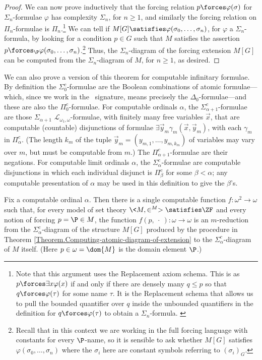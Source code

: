 \documentclass{amsart}
\newcommand{\xvec}{\vec{x}}
\newcommand{\yvec}{\vec{y}}
\begin{document}
\begin{proof}
We can now prove inductively that the forcing relation $p\forces\varphi(\sigma)$ for $\Sigma_n$-formulae $\varphi$ has complexity $\Sigma_n$, for $n\geq 1$, and similarly the forcing relation on $\Pi_n$-formulae is $\Pi_n$.\footnote{Note that this argument uses the Replacement axiom schema. This is as $p \forces \exists x \varphi(x)$ if and only if there are densely many $q \le p$ so that $q \forces \varphi(\tau)$ for some name $\tau$. It is the Replacement schema that allows us to pull the bounded quantifier over $q$ inside the unbounded quantifiers in the definition for $q \forces \varphi(\tau)$ to obtain a $\Sigma_n$-formula. \label{Footnote.Replacement}}
We can tell if $M[G]\satisfies\varphi(\sigma_0,\ldots,\sigma_n)$, for $\varphi$ a $\Sigma_n$-formula, by looking for a condition $p\in G$ such that $M$ satisfies the assertion $p\forces_\P\varphi(\sigma_0,\ldots,\sigma_n)$.\footnote{Recall that in this context we are working in the full forcing language with constants for every $\P$-name, so it is sensible to ask whether $M[G]$ satisfies $\varphi(\sigma_0,\ldots, \sigma_n)$ where the $\sigma_i$ here are constant symbols referring to $(\sigma_i)_G$.}
Thus, the $\Sigma_n$-diagram of the forcing extension $M[G]$ can be computed from the $\Sigma_n$-diagram of $M$, for $n\geq 1$, as desired.
\end{proof}

We can also prove a version of this theorem for computable infinitary formulae. By definition the $\Sigma_0^c$-formulae are the Boolean combinations of atomic formulae---which, since we work in the \Levy\ signature, means precisely the $\Delta_0$-formulae---and these are also the $\Pi_0^c$-formulae.  For computable ordinals $\alpha$, the $\Sigma_{\alpha+1}^c$-formulae are those $\Sigma_{\alpha+1}$ $\mathcal{L}_{\omega_1,\omega}$-formulae, with finitely many free variables $\xvec$, that are computable (countable) disjunctions of formulae $\exists \yvec_m \gamma_m(\xvec, \yvec_m)$, with each $\gamma_m$ in $\Pi_{\alpha}^c$. (The length $k_m$ of the tuple $\yvec_m=(y_{m,1},\ldots,y_{m,{k_m}})$ of variables may vary over $m$, but must be computable from $m$.) The $\Pi_{\alpha+1}^c$-formulae are their negations. For computable limit ordinals $\alpha$, the $\Sigma_{\alpha}^c$-formulae are computable disjunctions in which each individual disjunct is $\Pi_{\beta}^c$ for some $\beta < \alpha$; any computable presentation of $\alpha$ may be used in this definition to give the $\beta$'s.

\begin{theorem} \label{Theorem.Computing-infinitary-diagram}
Fix a computable ordinal $\alpha$.  Then there is a single computable function $f:\omega^2\to\omega$
such that, for every model of set theory $\<M,\in^M>\satisfies\ZF$
and every notion of forcing $p=\P\in M$, the function
$f(p,~\cdot~):\omega\to\omega$ is an $m$-reduction from the $\Sigma_\alpha^c$-diagram
of the structure $M[G]$ produced by the procedure in
Theorem \ref{Theorem.Computing-atomic-diagram-of-extension}
to the $\Sigma_\alpha^c$-diagram of $M$ itself.
(Here $p\in\omega=\dom{M}$ is the domain element $\P$.)
\end{theorem}
\end{document}
